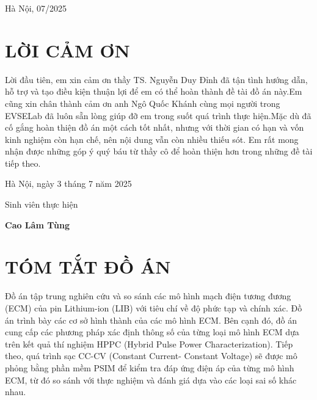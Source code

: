 \documentclass{thesis}
\begin{document}
    \begin{center}
        \vspace{48pt}
        \fontsize{14pt}{0pt}\selectfont Hà Nội, 07/2025
    \end{center}

    \thispagestyle{empty}
    \newpage
    \clearpage
    \thispagestyle{empty}
    \cleardoublepage
\section*{LỜI CẢM ƠN}
    \thispagestyle{empty}
Lời đầu tiên, em xin cảm ơn thầy TS. Nguyễn Duy Đỉnh đã tận tình hướng dẫn, hỗ trợ và tạo điều kiện thuận lợi để em có thể hoàn thành đề tài đồ án này.Em cũng xin chân thành cảm ơn anh Ngô Quốc Khánh cùng mọi người trong EVSELab đã luôn sẵn lòng giúp đỡ em trong suốt quá trình thực hiện.Mặc dù đã cố gắng hoàn thiện đồ án một cách tốt nhất, nhưng với thời gian có hạn và vốn kinh nghiệm còn hạn chế, nên nội dung vẫn còn nhiều thiếu sót. Em rất mong nhận được những góp ý quý báu từ thầy cô để hoàn thiện hơn trong những đề tài tiếp theo.


\vspace{6pt}
    \hspace{7cm}Hà Nội, ngày 3 tháng 7 năm 2025
        
        \hspace{8.6cm} Sinh viên thực hiện      %

\vspace{2cm}
    \hspace{9.25cm}\textbf{Cao Lâm Tùng} %

\newpage %
    \thispagestyle{empty} 
        \clearpage
            \thispagestyle{empty}
                \cleardoublepage
    \section*{TÓM TẮT ĐỒ ÁN}
    \thispagestyle{empty}
    Đồ án tập trung nghiên cứu và so sánh các mô hình mạch điện tương đương (ECM) của pin Lithium-ion (LIB) với tiêu chí về độ phức tạp và chính xác. Đồ án trình bày các cơ sở hình thành của các mô hình ECM. Bên cạnh đó, đồ án cung cấp các phương pháp xác định thông số của từng loại mô hình ECM dựa trên kết quả thí nghiệm HPPC (Hybrid Pulse Power Characterization). Tiếp theo, quá trình sạc CC-CV (Constant Current- Constant Voltage) sẽ được mô phỏng bằng phần mềm PSIM để kiểm tra đáp ứng điện áp của từng mô hình ECM, từ đó so sánh với thực nghiệm và đánh giá dựa vào các loại sai số khác nhau.
    \thispagestyle{empty}
    \cleardoublepage
\end{document}
